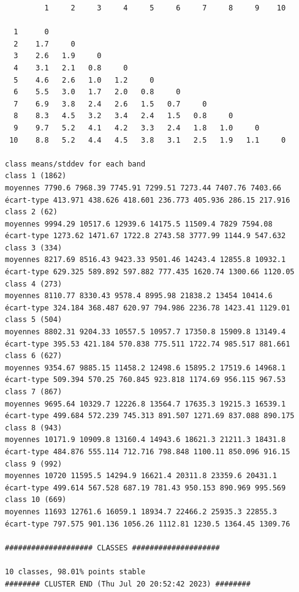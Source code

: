 \documentclass[environments,article,submit,pdftex,moreauthors]{Definitions/mdpi}
\begin{document}
\begin{scriptsize}
\begin{verbatim}
         1     2     3     4     5     6     7     8     9    10

  1      0
  2    1.7     0
  3    2.6   1.9     0
  4    3.1   2.1   0.8     0
  5    4.6   2.6   1.0   1.2     0
  6    5.5   3.0   1.7   2.0   0.8     0
  7    6.9   3.8   2.4   2.6   1.5   0.7     0
  8    8.3   4.5   3.2   3.4   2.4   1.5   0.8     0
  9    9.7   5.2   4.1   4.2   3.3   2.4   1.8   1.0     0
 10    8.8   5.2   4.4   4.5   3.8   3.1   2.5   1.9   1.1     0

class means/stddev for each band
class 1 (1862)
moyennes 7790.6 7968.39 7745.91 7299.51 7273.44 7407.76 7403.66
écart-type 413.971 438.626 418.601 236.773 405.936 286.15 217.916
class 2 (62)
moyennes 9994.29 10517.6 12939.6 14175.5 11509.4 7829 7594.08
écart-type 1273.62 1471.67 1722.8 2743.58 3777.99 1144.9 547.632
class 3 (334)
moyennes 8217.69 8516.43 9423.33 9501.46 14243.4 12855.8 10932.1
écart-type 629.325 589.892 597.882 777.435 1620.74 1300.66 1120.05
class 4 (273)
moyennes 8110.77 8330.43 9578.4 8995.98 21838.2 13454 10414.6
écart-type 324.184 368.487 620.97 794.986 2236.78 1423.41 1129.01
class 5 (504)
moyennes 8802.31 9204.33 10557.5 10957.7 17350.8 15909.8 13149.4
écart-type 395.53 421.184 570.838 775.511 1722.74 985.517 881.661
class 6 (627)
moyennes 9354.67 9885.15 11458.2 12498.6 15895.2 17519.6 14968.1
écart-type 509.394 570.25 760.845 923.818 1174.69 956.115 967.53
class 7 (867)
moyennes 9695.64 10329.7 12226.8 13564.7 17635.3 19215.3 16539.1
écart-type 499.684 572.239 745.313 891.507 1271.69 837.088 890.175
class 8 (943)
moyennes 10171.9 10909.8 13160.4 14943.6 18621.3 21211.3 18431.8
écart-type 484.876 555.114 712.716 798.848 1100.11 850.096 916.15
class 9 (992)
moyennes 10720 11595.5 14294.9 16621.4 20311.8 23359.6 20431.1
écart-type 499.614 567.528 687.19 781.43 950.153 890.969 995.569
class 10 (669)
moyennes 11693 12761.6 16059.1 18934.7 22466.2 25935.3 22855.3
écart-type 797.575 901.136 1056.26 1112.81 1230.5 1364.45 1309.76

#################### CLASSES ####################

10 classes, 98.01% points stable
######## CLUSTER END (Thu Jul 20 20:52:42 2023) ########
\end{verbatim}
\end{scriptsize}
\end{document}
